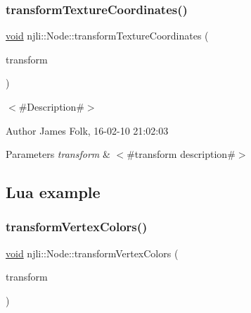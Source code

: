 \begin{DoxyCodeInclude}
\end{DoxyCodeInclude}
\mbox{\label{classnjli_1_1_node_a2ff7b1e0ec98a5ca99fb2633a7a936aa}} 
\subsubsection{\texorpdfstring{transform\+Texture\+Coordinates()}{transformTextureCoordinates()}}
{\footnotesize\ttfamily \mbox{\hyperlink{_thread_8h_af1e856da2e658414cb2456cb6f7ebc66}{void}} njli\+::\+Node\+::transform\+Texture\+Coordinates (\begin{DoxyParamCaption}\item[{const bt\+Transform \&}]{transform }\end{DoxyParamCaption})}



$<$\#\+Description\#$>$ 

\begin{DoxyAuthor}{Author}
James Folk, 16-\/02-\/10 21\+:02\+:03
\end{DoxyAuthor}

\begin{DoxyParams}{Parameters}
{\em transform} & $<$\#transform description\#$>$\\
\hline
\end{DoxyParams}
\hypertarget{classnjli_1_1_steering_behavior_wander_ex1}{}\subsection{Lua example}\label{classnjli_1_1_steering_behavior_wander_ex1}

\begin{DoxyCodeInclude}
\end{DoxyCodeInclude}
\mbox{\label{classnjli_1_1_node_afac33e777f9b0c7ad816e646258750af}} 
\subsubsection{\texorpdfstring{transform\+Vertex\+Colors()}{transformVertexColors()}}
{\footnotesize\ttfamily \mbox{\hyperlink{_thread_8h_af1e856da2e658414cb2456cb6f7ebc66}{void}} njli\+::\+Node\+::transform\+Vertex\+Colors (\begin{DoxyParamCaption}\item[{const bt\+Transform \&}]{transform }\end{DoxyParamCaption})}



